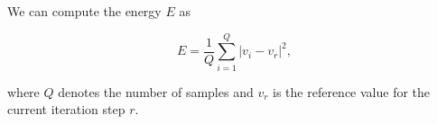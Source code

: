 We can compute the energy $E$ as

\begin{equation}
  E = \frac{1}{Q} \sum_{i=1}^{Q}{|v_i - v_r|^2},
\end{equation}

\noindent where $Q$ denotes the number of samples and $v_r$ is the
reference value for the current iteration step $r$.

